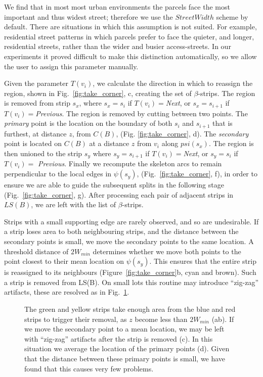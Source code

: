 We find that in most most urban environments the parcels face the most important and thus widest street; therefore we use the $StreetWidth$ scheme by default. There are situations in which this assumption is not suited. For example, residential street patterns in which parcels prefer to face the quieter, and longer, residential streets, rather than the wider and busier access-streets. In our experiments it proved difficult to make this distinction automatically, so we allow the user to assign this parameter manually.

Given the parameter $T(v_i)$, we calculate the direction in which to reassign the region, shown in Fig.~\ref{fig:take_corner}, c, creating the set of $\beta$-strips. The region is removed from strip $s_x$, where $s_x=s_{i}$ if $T(v_i) = $\emph{Next}, or $s_x=s_{i+1}$ if $T(v_i) = $\emph{Previous}.
The region is removed by cutting between two points. The \emph{primary} point is the location on the boundary of both $s_i$ and $s_{i+1}$ that is furthest, at distance $z$, from $C(B)$,  (Fig. \ref{fig:take_corner}, d). The \emph{secondary} point is located on $C(B)$ at a distance $z$ from  $v_i$ along $psi(s_x)$.
The region is then unioned to the strip $s_y$ where $s_y = s_{i+1}$ if $T(v_i) = $\emph{Next}, or $s_y = s_{i}$ if $T(v_i) =$ \emph{Previous}. Finally we recompute the skeleton arcs to remain perpendicular to the local edges in $\psi(s_y)$, (Fig.~\ref{fig:take_corner}, f), in order to ensure we are able to guide the subsequent splits in the following stage (Fig.~\ref{fig:take_corner}, g). After processing each pair of adjacent strips in $LS(B)$, we are left with the list of $\beta$-strips. 

Strips with a small supporting edge are rarely observed, and so are undesirable. If a strip loses area to both neighbouring strips, and the distance between the secondary points is small, we move the secondary points to the same location. A threshold distance of $2W_{min}$ determines whether we move both points to the point closest to their mean location on $\psi(s_y)$. This ensures that the entire strip is reassigned to its neighbours (Figure~\ref{fig:take_corner}b, cyan and brown). Such a strip is removed from LS(B). On small lots this routine may introduce ``zig-zag'' artifacts, these are resolved as in Fig.~\ref{fig:mergeissue}.

\begin{figure}
\centering
\def\svgwidth{0.8\columnwidth}

\caption[A problem with tolerances]{\label{fig:mergeissue}The green and yellow strips take enough area from the blue and red strips to trigger their removal, as $z$ become less than $2W_{min}$ (ab). If we move the secondary point to a mean location, we may be left with ``zig-zag'' artifacts after the strip is removed (c). In this situation we average the location of the primary points (d). Given that the distance between these primary points is small, we have found that this causes very few problems.}
\end{figure}

